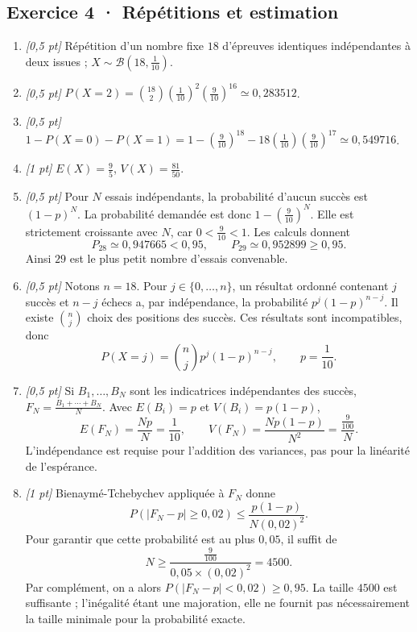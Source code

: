 \subsection*{Exercice 4 · Répétitions et estimation}\begin{enumerate}

\item \textit{[0,5 pt]} Répétition d'un nombre fixe $18$ d'épreuves identiques indépendantes à deux issues ; $X\sim\mathcal B(18,\frac{1}{10})$.

\item \textit{[0,5 pt]} $P(X=2)=\binom{18}2(\frac{1}{10})^2(\frac{9}{10})^{16}\simeq0{,}283512$.

\item \textit{[0,5 pt]} $1-P(X=0)-P(X=1)=1-(\frac{9}{10})^{18}-18(\frac{1}{10})(\frac{9}{10})^{17}\simeq0{,}549716$.

\item \textit{[1 pt]} $E(X)=\frac{9}{5}$, $V(X)=\frac{81}{50}$.

\item \textit{[0,5 pt]} Pour $N$ essais indépendants, la probabilité d'aucun succès est $(1-p)^N$. La probabilité demandée est donc $1-(\frac{9}{10})^N$. Elle est strictement croissante avec $N$, car $0<\frac{9}{10}<1$. Les calculs donnent
\[P_{28}\simeq0{,}947665<0{,}95,\qquad P_{29}\simeq0{,}952899\ge0{,}95.\]
Ainsi $29$ est le plus petit nombre d'essais convenable.

\item \textit{[0,5 pt]} Notons $n=18$. Pour $j\in\{0,\ldots,n\}$, un résultat ordonné contenant $j$ succès et $n-j$ échecs a, par indépendance, la probabilité $p^j(1-p)^{n-j}$. Il existe $\binom nj$ choix des positions des succès. Ces résultats sont incompatibles, donc
\[P(X=j)=\binom nj p^j(1-p)^{n-j},\qquad p=\frac{1}{10}.\]

\item \textit{[0,5 pt]} Si $B_1,\ldots,B_N$ sont les indicatrices indépendantes des succès, $F_N=\frac{B_1+\cdots+B_N}{N}$. Avec $E(B_i)=p$ et $V(B_i)=p(1-p)$,
\[E(F_N)=\frac{Np}{N}=\frac{1}{10},\qquad V(F_N)=\frac{Np(1-p)}{N^2}=\frac{\frac{9}{100}}{N}.\]
L'indépendance est requise pour l'addition des variances, pas pour la linéarité de l'espérance.

\item \textit{[1 pt]} Bienaymé-Tchebychev appliquée à $F_N$ donne
\[P(|F_N-p|\ge0{,}02)\le\frac{p(1-p)}{N(0{,}02)^2}.\]
Pour garantir que cette probabilité est au plus $0{,}05$, il suffit de
\[N\ge\frac{\frac{9}{100}}{0{,}05\times(0{,}02)^2}=4500.\]
Par complément, on a alors $P(|F_N-p|<0{,}02)\ge0{,}95$. La taille $4500$ est suffisante ; l'inégalité étant une majoration, elle ne fournit pas nécessairement la taille minimale pour la probabilité exacte.

\end{enumerate}

